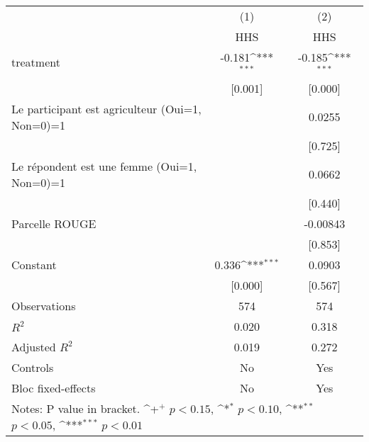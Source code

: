 {
\def\sym#1{\ifmmode^{#1}\else\(^{#1}\)\fi}
\begin{tabular*}{1.2\hsize}{@{\hskip\tabcolsep\extracolsep\fill}l*{2}{c}}
\cline{2-3}\cline{2-3}
     &\multicolumn{1}{c}{(1)}&\multicolumn{1}{c}{(2)}\\
     &\multicolumn{1}{c}{HHS}&\multicolumn{1}{c}{HHS}\\
\cline{2-3}
treatment&-0.181\sym{***}&-0.185\sym{***}\\
     &[0.001]         &[0.000]         \\
[1em]
Le participant est agriculteur (Oui=1, Non=0)=1&           &0.0255         \\
     &           &[0.725]         \\
[1em]
Le répondent est une femme (Oui=1, Non=0)=1&           &0.0662         \\
     &           &[0.440]         \\
[1em]
Parcelle ROUGE&           &-0.00843         \\
     &           &[0.853]         \\
[1em]
Constant&0.336\sym{***}&0.0903         \\
     &[0.000]         &[0.567]         \\
\cline{2-3}
Observations&574         &574         \\
\(R^{2}\)&0.020         &0.318         \\
Adjusted \(R^{2}\)&0.019         &0.272         \\
Controls&No         &Yes         \\
Bloc fixed-effects&No         &Yes         \\
\cline{2-3}\cline{2-3}
\multicolumn{3}{p{1.0\textwidth}}{\footnotesize Notes: P value in bracket. \sym{+} \(p<0.15\), \sym{*} \(p<0.10\), \sym{**} \(p<0.05\), \sym{***} \(p<0.01\)}\\
\end{tabular*}
}
